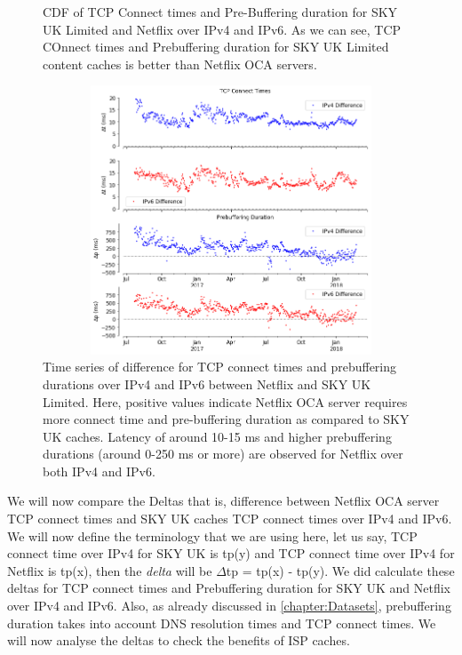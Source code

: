 \begin{figure}
\begin{minipage}{0.5\textwidth}
	\end{minipage}
	\caption[SKY UK Connect Time and Prebuffering Duration CDF Absolute]{CDF of TCP Connect times and Pre-Buffering duration for SKY UK Limited and Netflix over IPv4 and IPv6. As we can see, TCP COnnect times and Prebuffering duration for SKY UK Limited content caches is better than Netflix OCA servers.}
	\label{fig: SKY UK Connect Time and Prebuffering Duration CDF Absolute}
\end{figure}

\FloatBarrier

\begin{figure}[!ht]
	\centering
	\includegraphics[keepaspectratio, height=8cm, width=15cm]{figures/cache/bskyb/netflix-tcp-pd-delay-timeseries-asn-5607.png}
	\caption[SKY UK TCP Connect Times and Pre-Buffering Duration Timeseries Deltas]{Time series of difference for TCP connect times and prebuffering durations over IPv4 and IPv6 between Netflix and SKY UK Limited. 
	Here, positive values indicate Netflix OCA server requires more connect time and pre-buffering duration as compared to SKY UK caches. Latency of around 10-15 ms and higher prebuffering durations (around 0-250 ms or more) are observed for Netflix over both IPv4 and IPv6.}
	\label{fig:SYK UK TCP Connect Times and Pre-Buffering Duration Timeseries Deltas}
\end{figure}

We will now compare the Deltas that is, difference between Netflix OCA server TCP connect times and SKY UK caches TCP connect times over IPv4 and IPv6. We will now define the
terminology that we are using here, let us say, TCP connect time over IPv4 for SKY UK is tp(y) and TCP connect time over IPv4 for Netflix is tp(x), then the \textit{delta} will be $\Delta$tp = tp(x) - tp(y). 
We did calculate these deltas for TCP connect times and Prebuffering duration for SKY UK and Netflix over IPv4 and IPv6.
Also, as already discussed in \cref{chapter:Datasets}, prebuffering duration takes into account DNS resolution times and TCP connect times. 
We will now analyse the deltas to check the benefits of ISP caches.

